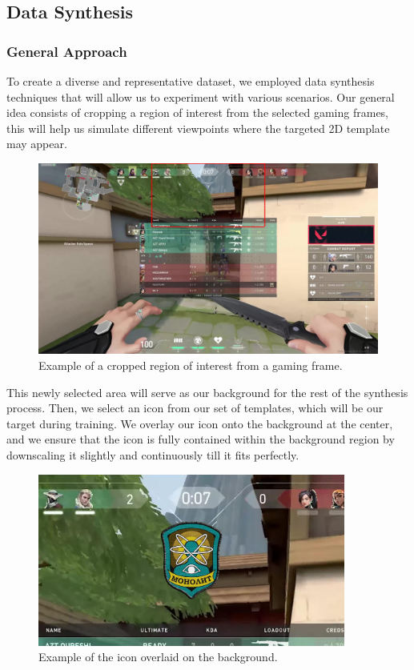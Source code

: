 \subsection{Data Synthesis}
\subsubsection{General Approach}
To create a diverse and representative dataset, we employed data synthesis
techniques that will allow us to experiment with various scenarios. Our general
idea consists of cropping a region of interest from the selected gaming frames,
this will help us simulate different viewpoints where the targeted 2D template
may appear.
\begin{figure}[H]
    \centering
    \includegraphics[width=\textwidth]{ressources/roi.jpg}
    \caption{Example of a cropped region of interest from a gaming frame.}
    \label{fig:roi_example}
\end{figure}
This newly selected area will serve as our background for the rest of the synthesis process. Then, we select an icon from our set of templates, which will be our target during training. We overlay our icon onto the background at the center, and we ensure that the icon is fully contained within the background region by downscaling it slightly and continuously till it fits perfectly.
\begin{figure}[H]
    \centering
    \includegraphics[width=0.9\textwidth]{ressources/image1.jpg}
    \caption{Example of the icon overlaid on the background.}
    \label{fig:overlay_example}
\end{figure}
